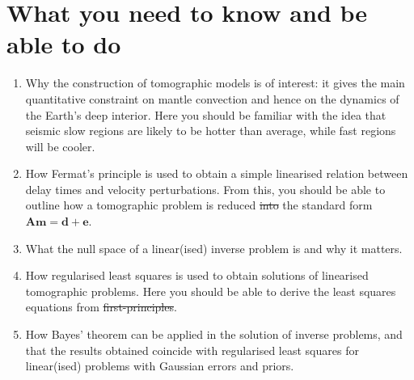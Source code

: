 \documentclass[a4paper,12pt]{paper}
\providecommand{\DIFadd}[1]{{\protect\color{blue}\uwave{#1}}} %
\providecommand{\DIFdel}[1]{{\protect\color{red}\sout{#1}}}                      %
\providecommand{\DIFaddbegin}{} %
\providecommand{\DIFaddend}{} %
\providecommand{\DIFdelbegin}{} %
\providecommand{\DIFdelend}{} %
\begin{document}
\section*{What you need to know and be able to do}
\DIFdelbegin %
\DIFdelend \DIFaddbegin \begin{enumerate}
    \DIFaddend \item[(i)] Why the construction of tomographic models is of interest: it gives the main quantitative 
    constraint on mantle convection and hence on the dynamics of the Earth's deep interior. Here you should 
    be familiar with the idea that seismic slow regions are likely to be hotter than average, while fast 
    regions will be cooler.
    \item[(ii)] How Fermat's principle is used to obtain a simple linearised relation between delay times 
    and velocity perturbations. From this, you should be able to outline how a tomographic problem is reduced 
    \DIFdelbegin \DIFdel{into }\DIFdelend \DIFaddbegin \DIFadd{to }\DIFaddend the standard form \DIFdelbegin \DIFdel{$\mathbf{A}\mathbf{m} = \mathbf{d} + \mathbf{e}$}\DIFdelend \DIFaddbegin \DIFadd{$\mathbf{d} = \mathbf{A}\mathbf{m} + \mathbf{e}$}\DIFaddend .
    \item[(iii)] What the null space of a linear(ised) inverse problem is and why it matters.
    \item[(iv)] How regularised least squares is used to obtain solutions of linearised tomographic problems. 
    Here you should be able to derive the least squares equations from \DIFdelbegin \DIFdel{first-principles}\DIFdelend \DIFaddbegin \DIFadd{first principles}\DIFaddend .
    \item[(v)] How Bayes' theorem can be applied in the solution of inverse problems, and that the 
    results obtained coincide with regularised least squares for linear(ised) problems with Gaussian errors and priors.
\DIFdelbegin %
\DIFdelend \DIFaddbegin \end{enumerate}
\DIFaddend 
\end{document}
